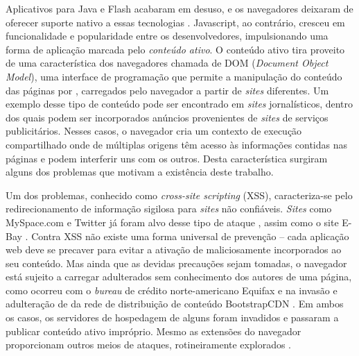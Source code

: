 Aplicativos para Java e Flash acabaram em desuso, e os navegadores deixaram de oferecer suporte nativo a essas tecnologias \cite{Verge2016, Adobe2017}. Javascript, ao contrário, cresceu em funcionalidade e popularidade entre os desenvolvedores, impulsionando uma forma de aplicação marcada pelo \textit{conteúdo ativo}. O conteúdo ativo tira proveito de uma característica dos navegadores chamada de DOM (\textit{Document Object Model}), uma interface de programação que permite a manipulação do conteúdo das páginas por {\scripts}, carregados pelo navegador a partir de \textit{sites} diferentes. Um exemplo desse tipo de conteúdo pode ser encontrado em \textit{sites} jornalísticos, dentro dos quais podem ser incorporados anúncios provenientes de \textit{sites} de serviços publicitários. Nesses casos, o navegador cria um contexto de execução compartilhado onde {\scripts} de múltiplas origens têm acesso às informações contidas nas páginas e podem interferir uns com os outros. Desta característica surgiram alguns dos problemas que motivam a existência deste trabalho.

Um dos problemas, conhecido como \textit{cross-site scripting} (XSS), caracteriza-se pelo redirecionamento de informação sigilosa para \textit{sites} não confiáveis. \textit{Sites} como MySpace.com e Twitter já foram alvo desse tipo de ataque \cite{IBM2017}, assim como o site E-Bay \cite{Vanunu2016}. Contra XSS não existe uma forma universal de prevenção -- cada aplicação web deve se precaver para evitar a ativação de {\scripts} maliciosamente incorporados ao seu conteúdo. Mas ainda que as devidas precauções sejam tomadas, o navegador está sujeito a carregar {\scripts} adulterados sem conhecimento dos autores de uma página, como ocorreu com o \textit{bureau} de crédito norte-americano Equifax \cite{Segura2017} e na invasão e adulteração de {\scripts} da rede de distribuição de conteúdo BootstrapCDN \cite{Dorfman2013}. Em ambos os casos, os servidores de hospedagem de alguns {\scripts} foram invadidos e passaram a publicar conteúdo ativo impróprio. Mesmo as extensões do navegador proporcionam outros meios de ataques, rotineiramente explorados \cite{Forrest2017}.

